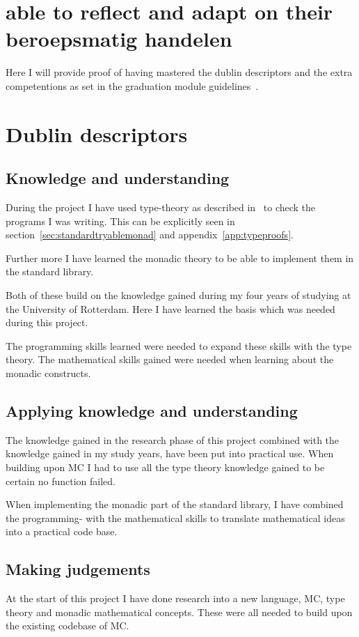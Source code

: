 \section{able to reflect and adapt on their beroepsmatig handelen}


Here I will provide proof of having mastered the dublin descriptors and the extra competentions as set in the graduation module guidelines~\cite{}.

\section{Dublin descriptors}
\subsection{Knowledge and understanding}
During the project I have used type-theory as described in~\cite{} to check the programs I was writing.
This can be explicitly seen in section~\ref{sec:standardtryablemonad} and appendix~\ref{app:typeproofs}.

Further more I have learned the monadic theory to be able to implement them in the standard library.

Both of these build on the knowledge gained during my four years of studying at the University of Rotterdam.
Here I have learned the basis which was needed during this project.

The programming skills learned were needed to expand these skills with the type theory.
The mathematical skills gained were needed when learning about the monadic constructs.


\subsection{Applying knowledge and understanding}
The knowledge gained in the research phase of this project combined with the knowledge gained in my study years, have been put into practical use.
When building upon MC I had to use all the type theory knowledge gained to be certain no function failed.

When implementing the monadic part of the standard library, I have combined the programming- with the mathematical skills to translate mathematical ideas into a practical code base.


\subsection{Making judgements}
At the start of this project I have done research into a new language, MC, type theory and monadic mathematical concepts.
These were all needed to build upon the existing codebase of MC.

